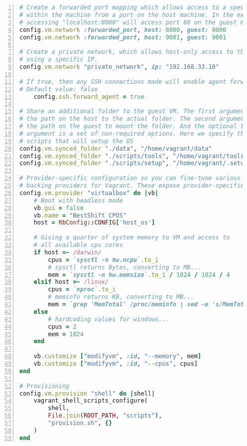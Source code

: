 \begin{lstlisting}[language=Ruby, caption=Vagrantfile,numbers=left, xleftmargin=1cm, numberstyle=\tiny\noncopynumber, label={vagrantfile}]
# Create a forwarded port mapping which allows access to a specific port
# within the machine from a port on the host machine. In the example below 
# accessing "localhost:8080" will access port 80 on the guest machine.
config.vm.network :forwarded_port, host: 8000, guest: 8000
config.vm.network :forwarded_port, host: 9001, guest: 9001

# Create a private network, which allows host-only access to the machine
# using a specific IP.
config.vm.network "private_network", ip: "192.168.33.10"

# If true, then any SSH connections made will enable agent forwarding.
# Default value: false
	config.ssh.forward_agent = true

# Share an additional folder to the guest VM. The first argument is
# the path on the host to the actual folder. The second argument is
# the path on the guest to mount the folder. And the optional third
# argument is a set of non-required options. Here we specify the 
# scripts that will setup the OS
config.vm.synced_folder "./data", "/home/vagrant/data"
config.vm.synced_folder "./scripts/tools", "/home/vagrant/tools"
config.vm.synced_folder "./scripts/setup", "/home/vagrant/.setup"

# Provider-specific configuration so you can fine-tune various
# backing providers for Vagrant. These expose provider-specific options.
config.vm.provider "virtualbox" do |vb|
	# Boot with headless mode
	vb.gui = false
	vb.name = "BestShift CPOS"
	host = RbConfig::CONFIG['host_os']

	# Giving a quarter of system memory to VM and access to 
	# all available cpu cores
	if host =~ /darwin/
		cpus = `sysctl -n hw.ncpu`.to_i
		# sysctl returns Bytes, converting to MB...
		mem = `sysctl -n hw.memsize`.to_i / 1024 / 1024 / 4
	elsif host =~ /linux/
		cpus = `nproc`.to_i
		# meminfo returns KB, converting to MB...
		mem = `grep 'MemTotal' /proc/meminfo | sed -e 's/MemTotal://' -e 's/ kB//'`.to_i / 1024 / 4
	else
		# hardcoding values for windows...
		cpus = 2
		mem = 1024
	end

	vb.customize ["modifyvm", :id, "--memory", mem]
	vb.customize ["modifyvm", :id, "--cpus", cpus]
end

# Provisioning
config.vm.provision "shell" do |shell|
	vagrant_shell_scripts_configure(
		shell,
		File.join(ROOT_PATH, "scripts"),
		"provision.sh",	{}
	)
end
\end{lstlisting}

